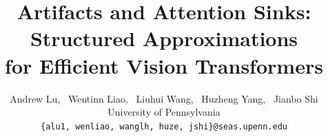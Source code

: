 \documentclass[10pt,twocolumn,letterpaper]{article}
\begin{document}
\title{Artifacts and Attention Sinks: Structured Approximations \\ for Efficient Vision Transformers}


\author{
Andrew Lu, \, Wentinn Liao, \, Liuhui Wang, \, Huzheng Yang, \, Jianbo Shi \\
University of Pennsylvania \\
{\tt\small \{alu1, wenliao, wanglh, huze, jshi\}@seas.upenn.edu}
}

\maketitle










{\small


}


\clearpage
\appendix



\end{document}
